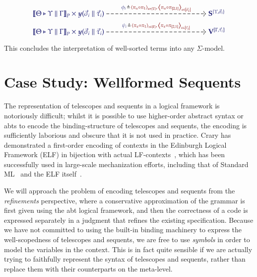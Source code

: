 \begin{gather*}
  \begin{tikzcd}[cramped, ampersand replacement = \&]
    {\IMode{
      {\SemBrackets{\Theta\triangleright\Upsilon\parallel\Gamma}}_{P}
      \times
      \Yoneda{\vec{\sigma}_i\parallel\vec{\tau}_i}
    }}
      \arrow[
        , r
        , dashed
        , "
          \Define
            {
              \phi_i\,
            }
            {
              \,
                \Tuple{\pi_u\circ\pi_1}_{u\in\Dom{\Upsilon}}
              ,
                \,\Tuple{\pi_u\circ\pi_{[2,1]}}_{u\in\Dom{\vec{\sigma}_i}}
            }
          "
      ]
\&[12.0em]
    {\IMode{\SymPsh^{\{\Upsilon,\vec{\sigma}_i\}}}}
\\[-1.0em]
    {\IMode{
      {\SemBrackets{
        \Theta\triangleright\Upsilon\parallel\Gamma
      }}_{P}
      \times
      \Yoneda{\vec{\sigma}_i\parallel\vec{\tau}_i}
    }}
      \arrow[
        , r
        , dashed
        , "
          \Define{
            \psi_i\,
          }{
            \,
              \Tuple{\pi_x\circ\pi_1}_{x\in\Dom{\Gamma}}
            ,
              \,\Tuple{\pi_x\circ\pi_{[2,1]}}_{x\in\Dom{\vec{\tau}_i}}
          }
          "
      ]
\&[12.0em]
    {\IMode{\VarPsh^{[\Gamma,\vec{\tau}_i]}}}
  \end{tikzcd}
\end{gather*}

This concludes the interpretation of well-sorted terms into any $\Sigma$-model.

\section{Case Study: Wellformed Sequents}

The representation of telescopes and sequents in a logical framework is
notoriously difficult; whilst it is possible to use higher-order abstract
syntax or abts to encode the binding-structure of telescopes and sequents, the
encoding is sufficiently laborious and obscure that it is not used in practice.
Crary has demonstrated a first-order encoding of contexts in the Edinburgh
Logical Framework (ELF) in bijection with actual LF-contexts~\cite{crary:2009},
which has been successfully used in large-scale mechanization efforts,
including that of Standard ML~\cite{lee-crary-harper:2007} and the ELF
itself~\cite{martens-crary:2012}.

We will approach the problem of encoding telescopes and sequents from the
\emph{refinements} perspective, where a conservative approximation of the
grammar is first given using the abt logical framework, and then the
correctness of a code is expressed separately in a judgment that refines the
existing specification.  Because we have not committed to using the built-in
binding machinery to express the well-scopedness of telescopes and sequents, we
are free to use \emph{symbols} in order to model the variables in the context.
This is in fact quite sensible if we are actually trying to faithfully
represent the syntax of telescopes and sequents, rather than replace them with
their counterparts on the meta-level.

